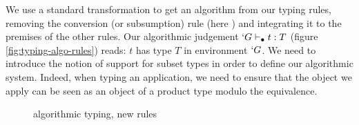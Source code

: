 \documentclass{llncs}
\def\figureshrink{0em}
\begin{document}
\begin{paragraph}{}
We use a standard transformation to get an algorithm from our typing
rules, removing the conversion (or subsumption) rule
(here ) and integrating it to the premises of the other rules.
Our algorithmic judgement $`G \vdash_{\bullet} t : T$
(figure \vref{fig:typing-algo-rules})
reads: $t$ has type $T$ in environment $`G$.
We need to introduce the notion of support for subset types in order to
define our algorithmic system. Indeed, when typing an application, 
we need to ensure that the object we apply can be seen as an object of a
product type modulo the equivalence. 
\begin{figure*}[t]
  \def\infvspace{0.5em}
    \def\type{\typea}
    \def\subt{\subta}
    \def\sub{\suba}
    \def\fCenter{\typea}
    \begin{center}
    
    
    
    


    \vspace{\infvspace}
    \AppA\DP

    
    \vspace{\infvspace}
    \SumDepA\DP

    \vspace{\infvspace}
    \PiLeftA\DP
    \quad\hspace{-2.5em}
    \PiRightA\DP

  \end{center}
  \vspace{\figureshrink}
  \caption{\Russell{} algorithmic typing, new rules}
  \label{fig:typing-algo-rules}
\end{figure*}


\end{paragraph}
\end{document}
